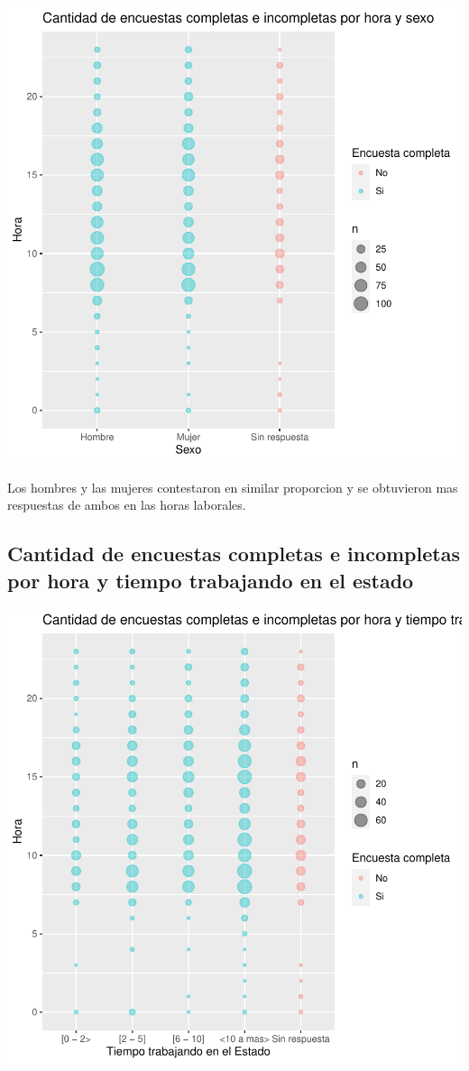 \documentclass{article}
\begin{document}
\includegraphics{seguimientov3-043}

Los hombres y las mujeres contestaron en similar proporcion y se obtuvieron mas respuestas de ambos en las horas laborales.

\subsection{Cantidad de encuestas completas e incompletas por hora y tiempo trabajando en el estado}

\includegraphics{seguimientov3-044}
\end{document}
